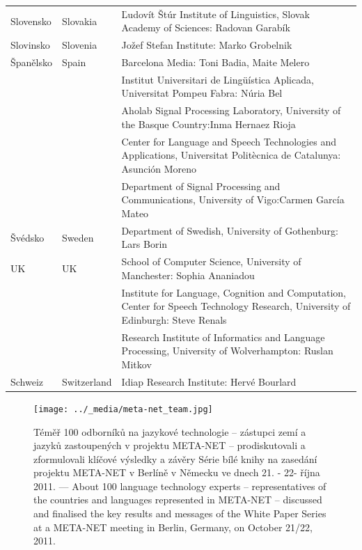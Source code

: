 \begin{longtable}{@{}llp{113mm}@{}}
  Slovensko & \textcolor{grey1}{Slovakia} & Ľudovít Štúr Institute of Linguistics, Slovak Academy of Sciences: Radovan Garabík \\ \addlinespace 
  Slovinsko & \textcolor{grey1}{Slovenia} & Jožef Stefan Institute: Marko Grobelnik \\ \addlinespace 
  Španělsko & \textcolor{grey1}{Spain} & Barcelona Media: Toni Badia, Maite Melero \\ \addlinespace 
  & & Institut Universitari de Lingüística Aplicada, Universitat Pompeu Fabra: Núria Bel \\ \addlinespace 
  & & Aholab Signal Processing Laboratory, University of the Basque Country:\newline Inma Hernaez Rioja \\ \addlinespace 
  & & Center for Language and Speech Technologies and Applications, Universitat Politècnica de Catalunya:  Asunción Moreno \\ \addlinespace 
  & & Department of Signal Processing and Communications, University of Vigo:\newline Carmen García Mateo \\ \addlinespace
  Švédsko & \textcolor{grey1}{Sweden} & Department of Swedish, University of Gothenburg: Lars Borin \\ \addlinespace 
  UK & \textcolor{grey1}{UK} & 
  School of Computer Science, University of Manchester: Sophia Ananiadou \\ \addlinespace 
  & & Institute for Language, Cognition and Computation, Center for Speech Technology Research, University of Edinburgh: Steve Renals \\ \addlinespace 
  & & Research Institute of Informatics and Language Processing, University of Wolverhampton: Ruslan Mitkov \\ \addlinespace  
  Schweiz & \textcolor{grey1}{Switzerland} & Idiap Research Institute: Hervé Bourlard  %
    
\end{longtable}
\normalsize
 
\renewcommand*{\figureformat}{}
\renewcommand*{\captionformat}{}

\begin{figure}[htbp]
  \center
  \texttt{[image: ../\_media/meta-net\_team.jpg]}
  \caption{Téměř 100 odborníků na jazykové technologie – zástupci zemí a jazyků zastoupených v projektu META-NET – prodiskutovali a zformulovali klíčové výsledky a závěry Série bílé knihy na zasedání projektu META-NET v Berlíně v Německu ve dnech 21. - 22- října 2011. --- \textcolor{grey1}{About 100 language technology experts -- representatives of the countries and languages represented in META-NET -- discussed and finalised the key results and messages of the White Paper Series at a META-NET meeting in Berlin, Germany, on October 21/22, 2011.}}
  \medskip
\end{figure}

